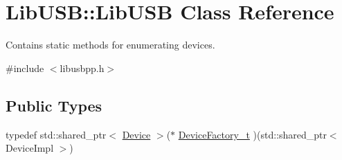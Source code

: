 \hypertarget{class_lib_u_s_b_1_1_lib_u_s_b}{\section{Lib\-U\-S\-B\-:\-:Lib\-U\-S\-B Class Reference}
\label{class_lib_u_s_b_1_1_lib_u_s_b}
}


Contains static methods for enumerating devices.  




{\ttfamily \#include $<$libusbpp.\-h$>$}

\subsection*{Public Types}
\begin{DoxyCompactItemize}
\item 
typedef std\-::shared\-\_\-ptr$<$ \hyperlink{class_lib_u_s_b_1_1_device}{Device} $>$($\ast$ \hyperlink{class_lib_u_s_b_1_1_lib_u_s_b_a532d474d390477dffd2109e8540be558}{Device\-Factory\-\_\-t} )(std\-::shared\-\_\-ptr$<$ Device\-Impl $>$)
\end{DoxyCompactItemize}
